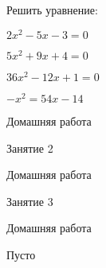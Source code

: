 \begin{class}[number=1]
\begin{listofex}
\begin{enumcols}[itemcolumns=3]
			\item {}
			\item {}
		\end{enumcols}
		\item Решить уравнение:
		\begin{enumcols}[itemcolumns=2]
			\item \( 2x^2-5x-3=0 \)
			\item \( 5x^2+9x+4=0 \)
			\item \( 36x^2-12x+1=0 \)
			\item \( -x^2=54x-14 \)
		\end{enumcols}
	\end{listofex}
\end{class}

\begin{homework}[number=1]
		\begin{listofex}
			\item Домашняя работа
		\end{listofex}
\end{homework}

\begin{class}[number=2]
	\begin{listofex}
		\item Занятие 2
	\end{listofex}
\end{class}

\begin{homework}[number=2]
	\begin{listofex}
		\item Домашняя работа
	\end{listofex}
\end{homework}

\begin{class}[number=3]
	\begin{listofex}
		\item Занятие 3
	\end{listofex}
\end{class}

\begin{homework}[number=3]
	\begin{listofex}
		\item Домашняя работа
	\end{listofex}
\end{homework}

\begin{class}[number=4]
	\begin{listofex}
		\item Пусто
	\end{listofex}
\end{class}
